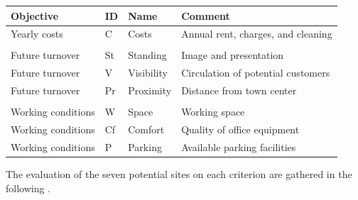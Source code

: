 \documentclass[a4paper,12pt,english]{sphinxhowto}
\begin{document}
\begin{savenotes}\sphinxattablestart
\centering
{}
\sphinxthecaptionisattop
{}\label{\detokenize{tutorial:offcrit}}
\sphinxaftertopcaption
\begin{tabulary}{\linewidth}[t]{|T|T|T|T|}
\hline
\sphinxstyletheadfamily 
Objective
&\sphinxstyletheadfamily 
ID
&\sphinxstyletheadfamily 
Name
&\sphinxstyletheadfamily 
Comment
\\
\hline
Yearly costs
&
C
&
Costs
&
Annual rent, charges, and cleaning
\\
\hline

&

&

&

\\
\hline
Future turnover
&
St
&
Standing
&
Image and presentation
\\
\hline
Future turnover
&
V
&
Visibility
&
Circulation of potential customers
\\
\hline
Future turnover
&
Pr
&
Proximity
&
Distance from town center
\\
\hline

&

&

&

\\
\hline
Working conditions
&
W
&
Space
&
Working space
\\
\hline
Working conditions
&
Cf
&
Comfort
&
Quality of office equipment
\\
\hline
Working conditions
&
P
&
Parking
&
Available parking facilities
\\
\hline
\end{tabulary}
\par
\sphinxattableend\end{savenotes}

The evaluation of the seven potential sites on each criterion are gathered in the following .
\end{document}
